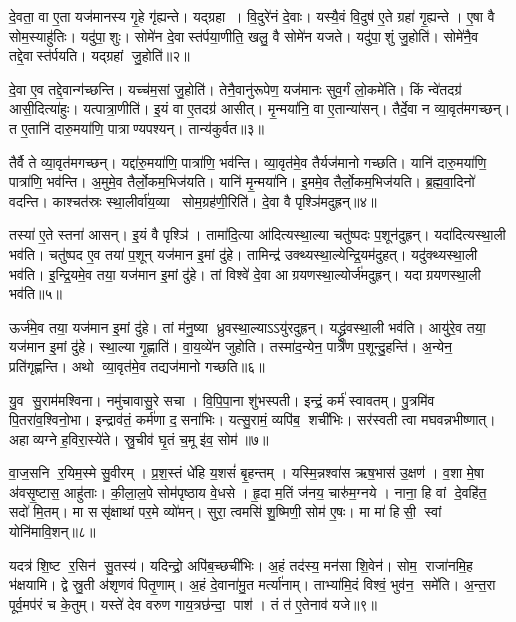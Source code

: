दे॒वता॒ वा ए॒ता यज॑मानस्य गृ॒हे गृ॑ह्यन्ते। यद्ग्रहा। वि॒दुरे॑नं दे॒वाः। यस्यै॒वं वि॒दुष॑ ए॒ते ग्रहा॑ गृ॒ह्यन्ते। ए॒षा वै सोम॒स्याहु॑तिः। यदु॑पा॒शुः। सोमे॑न दे॒वास्त॑र्पया॒णीति॒ खलु॒ वै सोमे॑न यजते। यदु॑पा॒शुं जु॒होति॑। सोमे॑नै॒व तद्दे॒वास्त॑र्पयति। यद्ग्रहां जु॒होति॑॥२॥

दे॒वा ए॒व तद्दे॒वान्ग॑च्छन्ति। यच्च॑म॒सां जु॒होति॑। तेनै॒वानु॑रूपेण॒ यज॑मानः सुव॒र्गं लो॒कमे॑ति। किं न्वे॑तदग्र॑ आसी॒दित्या॑हुः। यत्पात्रा॒णीति॑। इ॒यं वा ए॒तदग्र॑ आसीत्। मृ॒न्मया॑नि॒ वा ए॒तान्या॑सन्। तैर्दे॒वा न व्या॒वृत॑मगच्छन्। त ए॒तानि॑ दारु॒मया॑णि॒ पात्राण्यपश्यन्। तान्य॑कुर्वत॥३॥

तैर्वै ते व्या॒वृत॑मगच्छन्। यद्दा॑रु॒मया॑णि॒ पात्रा॑णि॒ भव॑न्ति। व्या॒वृत॑मे॒व तैर्यज॑मानो गच्छति। यानि॑ दारु॒मया॑णि॒ पात्रा॑णि॒ भव॑न्ति। अ॒मुमे॒व तैर्लो॒कम॒भिज॑यति। यानि॑ मृ॒न्मया॑नि। इ॒ममे॒व तैर्लो॒कम॒भिज॑यति। ब्र॒ह्म॒वा॒दिनो॑ वदन्ति। काश्चत॑स्रः स्था॒लीर्वा॑य॒व्या सोम॒ग्रह॑णी॒रिति॑। दे॒वा वै पृश्ञि॑मदुह्रन्॥४॥

तस्या॑ ए॒ते स्तना॑ आसन्। इ॒यं वै पृश्ञि॑। तामा॑दि॒त्या आ॑दित्यस्था॒ल्या चतु॑ष्पदः प॒शून॑दुह्रन्। यदा॑दित्यस्था॒ली भव॑ति। चतु॑ष्पद ए॒व तया॑ प॒शून् यज॑मान इ॒मां दु॑हे। तामिन्द्र॑ उक्थ्यस्था॒ल्येन्द्रि॒यम॑दुहत्। यदु॑क्थ्यस्था॒ली भव॑ति। इ॒न्द्रि॒यमे॒व तया॒ यज॑मान इ॒मां दु॑हे। तां विश्वे॑ दे॒वा आग्रयणस्था॒ल्योर्ज॑मदुह्रन्। यदाग्रयणस्था॒ली भव॑ति॥५॥

ऊर्ज॑मे॒व तया॒ यज॑मान इ॒मां दु॑हे। तां म॑नु॒ष्या ध्रुवस्था॒ल्याऽऽयु॑रदुह्रन्। यद्ध्रु॑वस्था॒ली भव॑ति। आयु॑रे॒व तया॒ यज॑मान इ॒मां दु॑हे। स्था॒ल्या गृ॒ह्णाति॑। वा॒य॒व्ये॑न जुहोति। तस्मा॑द॒न्येन॒ पात्रे॑ण प॒शून्दु॒हन्ति॑। अ॒न्येन॒ प्रति॑गृह्णन्ति। अथो व्या॒वृत॑मे॒व तद्यज॑मानो गच्छति॥६॥\anuvakamend[ग्र॒ह॒त्वं ग्रहां जु॒होत्य॑कुर्वतादुह्रन्नाग्रयणस्था॒ली भव॑ति॒ नव॑ च]

यु॒व सु॒राम॑मश्विना। नमु॑चावासु॒रे सचा। वि॒पि॒पा॒ना शु॑भस्पती। इन्द्रं॒ कर्म॑ स्वावतम्। पु॒त्रमि॑व पि॒तरा॑व॒श्विनो॒भा। इन्द्राव॑तं॒ कर्म॑णा द॒सना॑भिः। यत्सु॒रामं॒ व्यपि॑ब॒ शची॑भिः। सर॑स्वती त्वा मघवन्नभीष्णात्। अहाव्यग्ने ह॒विरा॒स्ये॑ते। स्रु॒चीव॑ घृ॒तं च॒मू इ॑व॒ सोम॑॥७॥

वा॒ज॒सनि र॒यिम॒स्मे सु॒वीरम्। प्र॒श॒स्तं धे॑हि य॒शसं॑ बृ॒हन्तम्। यस्मि॒न्नश्वा॑स ऋष॒भास॑ उ॒क्षण॑। व॒शा मे॒षा अ॑वसृ॒ष्टास॒ आहु॑ताः। की॒ला॒ल॒पे सोम॑पृष्ठाय वे॒धसे। हृ॒दा म॒तिं ज॑नय॒ चारु॑म॒ग्नये। नाना॒ हि वां दे॒वहि॑त॒ सदो॑ मि॒तम्। मा ससृ॑क्षाथां पर॒मे व्यो॑मन्। सुरा॒ त्वमसि॑ शु॒ष्मिणी॒ सोम॑ ए॒षः। मा मा॑ हिसी॒ स्वां योनि॑मावि॒शन्॥८॥

यदत्र॑ शि॒ष्ट र॒सिन॑ सु॒तस्य॑। यदिन्द्रो॒ अपि॑ब॒च्छची॑भिः। अ॒हं तद॑स्य॒ मन॑सा शि॒वेन॑। सोम॒ राजा॑नमि॒ह भ॑क्षयामि। द्वे स्रु॒ती अ॑शृणवं पितृ॒णाम्। अ॒हं दे॒वाना॑मु॒त मर्त्या॑नाम्। ताभ्या॑मि॒दं विश्वं॒ भुव॑न॒ समे॑ति। अ॒न्त॒रा पूर्व॒मप॑रं च के॒तुम्। यस्ते॑ देव वरुण गाय॒त्रछ॑न्दा॒ पाश॑। तं त॑ ए॒तेनाव॑ यजे॥९॥

